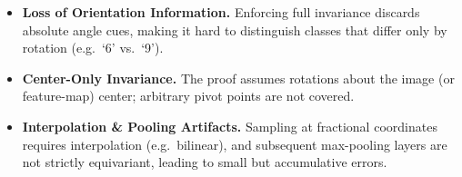 \begin{itemize}
  \item \textbf{Loss of Orientation Information.}  Enforcing full invariance discards absolute angle cues, making it hard to distinguish classes that differ only by rotation (e.g.\ ‘6’ vs.\ ‘9’).  
  \item \textbf{Center-Only Invariance.}  The proof assumes rotations about the image (or feature-map) center; arbitrary pivot points are not covered.  
  \item \textbf{Interpolation \& Pooling Artifacts.}  Sampling at fractional coordinates requires interpolation (e.g.\ bilinear), and subsequent max-pooling layers are not strictly equivariant, leading to small but accumulative errors.
\end{itemize}